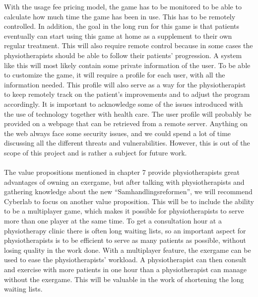 With the usage fee pricing model, the game has to be monitored to be able to calculate how much time the game has been in use. This has to be remotely controlled. In addition, the goal in the long run for this game is that patients eventually can start using this game at home as a supplement to their own regular treatment. This will also require remote control because in some cases the physiotherapists should be able to follow their patients’ progression. A system like this will most likely contain some private information of the user. To be able to customize the game, it will require a profile for each user, with all the information needed. This profile will also serve as a way for the physiotherapist to keep remotely track on the patient’s improvements and to adjust the program accordingly. It is important to acknowledge some of the issues introduced with the use of technology together with health care. The user profile will probably be provided on a webpage that can be retrieved from a remote server. Anything on the web always face some security issues, and we could spend a lot of time discussing all the different threats and vulnerabilities. However, this is out of the scope of this project and is rather a subject for future work. \\ \\ 
The value propositions mentioned in chapter 7 provide physiotherapists great advantages of owning an exergame, but after talking with physiotherapists and gathering knowledge about the new “Samhandlingsreformen”, we will recommend Cyberlab to focus on another value proposition. This will be to include the ability to be a multiplayer game, which makes it possible for physiotherapists to serve more than one player at the same time. To get a consultation hour at a physiotherapy clinic there is often long waiting lists, so an important aspect for physiotherapists is to be efficient to serve as many patients as possible, without losing quality in the work done. With a multiplayer feature, the exergame can be used to ease the physiotherapists’ workload. A physiotherapist can then consult and exercise with more patients in one hour than a physiotherapist can manage without the exergame. This will be valuable in the work of shortening the long waiting lists. \\ \\
